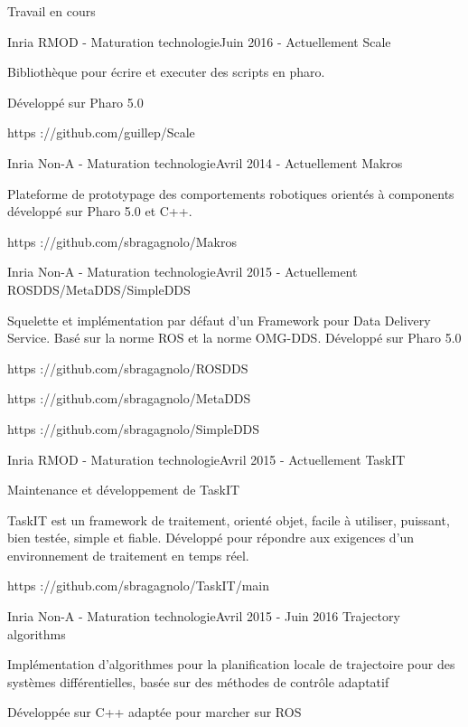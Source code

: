 \documentclass{resume} %
\begin{document}
\begin{rSection}{Travail en cours}
	\begin{rSubsection}{Inria RMOD - Maturation technologie}{Juin 2016 - Actuellement }{Scale}
		\item Biblioth\`eque pour \'ecrire et executer des scripts en pharo. 
		\item D\'{e}velopp\'{e} sur Pharo 5.0 
		\item https ://github.com/guillep/Scale		
	\end{rSubsection}
	
	\begin{rSubsection}{Inria Non-A - Maturation technologie}{Avril 2014 - Actuellement }{Makros}
		\item Plateforme de prototypage des comportements robotiques orient\'{e}s \`a components d\'{e}velopp\'{e} sur Pharo 5.0 et C++.
		\item https ://github.com/sbragagnolo/Makros		
	\end{rSubsection}
	
	\begin{rSubsection}{Inria Non-A - Maturation technologie}{Avril 2015 - Actuellement }{ROSDDS/MetaDDS/SimpleDDS}
		\item Squelette et impl\'{e}mentation par d\'{e}faut d'un Framework pour Data Delivery Service.  Bas\'{e} sur la norme ROS et la norme OMG-DDS. D\'{e}velopp\'{e} sur Pharo 5.0 
		\item https ://github.com/sbragagnolo/ROSDDS		
		\item https ://github.com/sbragagnolo/MetaDDS
		\item https ://github.com/sbragagnolo/SimpleDDS
	\end{rSubsection}
	\begin{rSubsection}{Inria RMOD - Maturation technologie}{Avril 2015 - Actuellement }{TaskIT}
		\item Maintenance et d\'{e}veloppement de TaskIT
		\item TaskIT est un framework de traitement, orient\'{e} objet, facile \`{a} utiliser, puissant, bien test\'{e}e, simple et fiable. D\'{e}velopp\'{e} pour r\'{e}pondre aux exigences d'un environnement de traitement en temps r\'{e}el.
		\item  https ://github.com/sbragagnolo/TaskIT/main
	\end{rSubsection}
	\begin{rSubsection}{Inria Non-A - Maturation technologie}{Avril 2015 - Juin 2016 }{Trajectory algorithms}
		\item Impl\'{e}mentation d'algorithmes pour la planification locale de trajectoire pour des syst\`emes diff\'{e}rentielles, bas\'{e}e sur des m\'ethodes de contr\^ole adaptatif 
		\item D\'{e}velopp\'{e}e sur C++ adapt\'{e}e pour marcher sur ROS
	\end{rSubsection}
	
	

\end{rSection}
\end{document}
